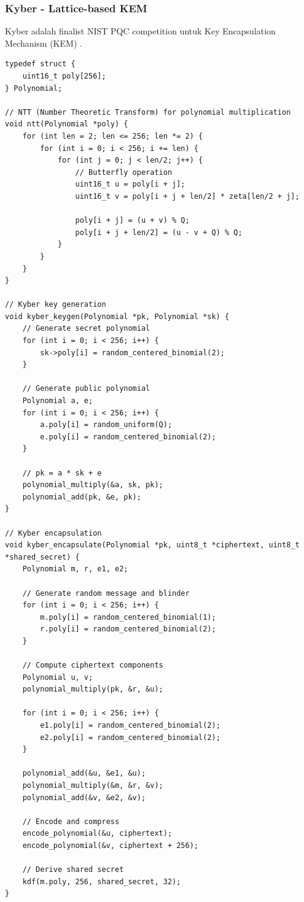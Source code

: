 \subsubsection{Kyber - Lattice-based KEM}

Kyber adalah finalist NIST PQC competition untuk Key Encapsulation\\ Mechanism (KEM) \cite{bos2018}.

\begin{lstlisting}[style=cstyle, caption={Kyber KEM Simplified}]
typedef struct {
    uint16_t poly[256];
} Polynomial;

// NTT (Number Theoretic Transform) for polynomial multiplication
void ntt(Polynomial *poly) {
    for (int len = 2; len <= 256; len *= 2) {
        for (int i = 0; i < 256; i += len) {
            for (int j = 0; j < len/2; j++) {
                // Butterfly operation
                uint16_t u = poly[i + j];
                uint16_t v = poly[i + j + len/2] * zeta[len/2 + j];
                
                poly[i + j] = (u + v) % Q;
                poly[i + j + len/2] = (u - v + Q) % Q;
            }
        }
    }
}

// Kyber key generation
void kyber_keygen(Polynomial *pk, Polynomial *sk) {
    // Generate secret polynomial
    for (int i = 0; i < 256; i++) {
        sk->poly[i] = random_centered_binomial(2);
    }
    
    // Generate public polynomial
    Polynomial a, e;
    for (int i = 0; i < 256; i++) {
        a.poly[i] = random_uniform(Q);
        e.poly[i] = random_centered_binomial(2);
    }
    
    // pk = a * sk + e
    polynomial_multiply(&a, sk, pk);
    polynomial_add(pk, &e, pk);
}

// Kyber encapsulation
void kyber_encapsulate(Polynomial *pk, uint8_t *ciphertext, uint8_t *shared_secret) {
    Polynomial m, r, e1, e2;
    
    // Generate random message and blinder
    for (int i = 0; i < 256; i++) {
        m.poly[i] = random_centered_binomial(1);
        r.poly[i] = random_centered_binomial(2);
    }
    
    // Compute ciphertext components
    Polynomial u, v;
    polynomial_multiply(pk, &r, &u);
    
    for (int i = 0; i < 256; i++) {
        e1.poly[i] = random_centered_binomial(2);
        e2.poly[i] = random_centered_binomial(2);
    }
    
    polynomial_add(&u, &e1, &u);
    polynomial_multiply(&m, &r, &v);
    polynomial_add(&v, &e2, &v);
    
    // Encode and compress
    encode_polynomial(&u, ciphertext);
    encode_polynomial(&v, ciphertext + 256);
    
    // Derive shared secret
    kdf(m.poly, 256, shared_secret, 32);
}
\end{lstlisting}

